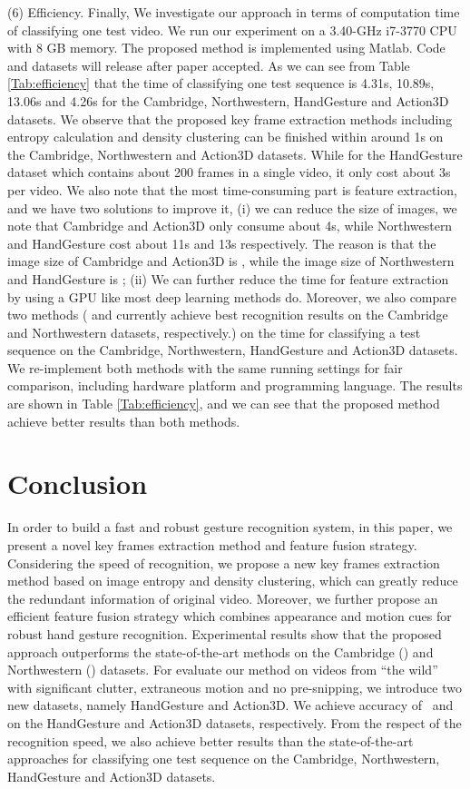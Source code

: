 \documentclass[5p]{elsarticle}
\begin{document}
\noindent (6) Efficiency.
Finally, We investigate our approach in terms of computation time of classifying one test video.
We run our experiment on a 3.40-GHz i7-3770 CPU with 8 GB memory.
The proposed method is implemented using Matlab.
Code and datasets will release after paper accepted.
As we can see from Table \ref{Tab:efficiency} that the time of classifying one test sequence is 4.31s, 10.89s, 13.06s and 4.26s for the Cambridge, Northwestern, HandGesture and Action3D datasets.
We observe that the proposed key frame extraction methods including entropy calculation and density clustering can be finished within around 1s on the Cambridge, Northwestern and Action3D datasets.
While for the HandGesture dataset which contains about 200 frames in a single video, it only cost about 3s per video. 
We also note that the most time-consuming part is feature extraction, and we have two solutions to improve it, (i) we can reduce the size of images, we note that Cambridge and Action3D only consume about 4s, while Northwestern and HandGesture cost about 11s and 13s respectively.
The reason is that the image size of Cambridge and Action3D is , while the image size of Northwestern and HandGesture is ; (ii) We can further reduce the time for feature extraction by using a GPU like most deep learning methods do.
Moreover, we also compare two methods ( \cite{zhao2008information} and \cite{liu2013synthesis}  currently achieve best recognition results on the Cambridge and Northwestern datasets, respectively.) on the time for classifying a test sequence on the Cambridge, Northwestern, HandGesture and Action3D datasets.
We re-implement both methods with the same running settings for fair comparison, including hardware platform  and programming language.
The results are shown in Table \ref{Tab:efficiency}, and we can see that the proposed method achieve better results than both methods.

\section{Conclusion}
\label{sec:concl}
In order to build a fast and robust gesture recognition system, in this paper, we present a novel key frames extraction method and feature fusion strategy.
Considering the speed of recognition, we propose a new key frames extraction method based on image entropy and density clustering, which can greatly reduce the redundant information of original video.
Moreover, we further propose an efficient feature fusion strategy which combines appearance and motion cues for robust hand gesture recognition.
Experimental results show that the proposed approach outperforms the state-of-the-art methods on the Cambridge () and Northwestern () datasets.
For evaluate our method on videos from ``the wild'' with significant clutter, extraneous motion and no pre-snipping, we introduce two new datasets, namely HandGesture and Action3D.
We achieve accuracy of~ and  on the HandGesture and Action3D datasets, respectively.
From the respect of the recognition speed, we also achieve better results than the state-of-the-art approaches for classifying one test sequence on the Cambridge, Northwestern, HandGesture and Action3D datasets.
\end{document}
